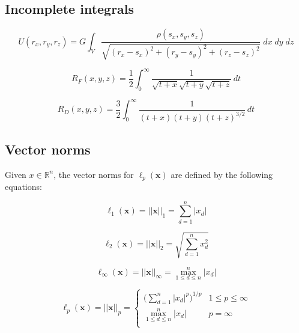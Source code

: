 \subsection{Incomplete integrals\label{appendix:incomplete_integrals}}

\begin{equation}
    U(r_x, r_y, r_z) = G\int_V\frac{\rho{(s_x,s_y,s_z)}}{\sqrt{(r_x-s_x)^2+(r_y-s_y)^2+(r_z-s_z)^2}}\;dx\;dy\;dz
    \label{eq:ur-gen-rect}
\end{equation}

\begin{equation}
    R_F\!\left(x, y, z\right) = \frac{1}{2} \int_{0}^{\infty} \frac{1}{\sqrt{t + x} \sqrt{t + y} \sqrt{t + z}} \, dt
    \label{eq:elliptic_RF}
\end{equation}

\begin{equation}
    R_D\!\left(x, y, z\right) = \frac{3}{2} \int_{0}^{\infty} \frac{1}{\left(t + x\right) \left(t + y\right) {\left(t + z\right)}^{3 / 2}} \, dt
    \label{eq:elliptic_RD}
\end{equation}



\subsection{Vector norms\label{appendix:vector_norms}}
Given $x\in\mathbb{R}^n$, the vector norms for $\ell_p(\mathbf{x})$ are defined
by the following equations:

\begin{equation}
    \ell_1(\mathbf{x})=||\mathbf{x}||_1 = \sum_{d=1}^n |x_d|
\end{equation}

\begin{equation}
    \ell_2(\mathbf{x})=||\mathbf{x}||_2 = \sqrt{\sum_{d=1}^n x_d^2}
\end{equation}

\begin{equation}
    \ell_\infty(\mathbf{x})=||\mathbf{x}||_\infty = \max_{1\leq{d}\leq{n}}^n |x_d|
\end{equation}

\begin{equation}
    \ell_p(\mathbf{x})=||\mathbf{x}||_p=
    \begin{cases}
        \bigg(\sum_{d=1}^n |x_d|^p\bigg)^{1/p}    &  1\leq{}p\le \infty \\
        \max_{1\leq{d}\leq{n}}^n |x_d|            &  p=\infty \\
    \end{cases}
    \label{eq:ell-p}
\end{equation}


